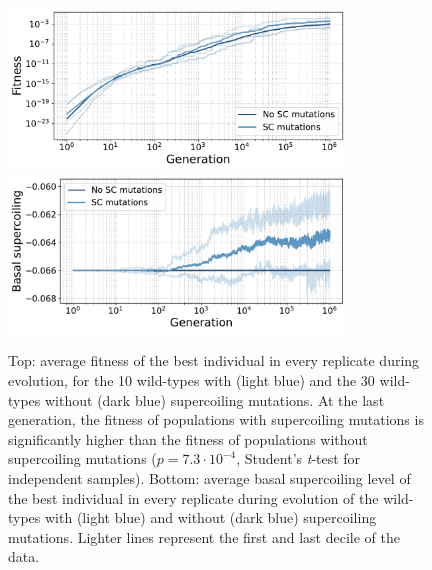 \begin{figure}
\centering
\includegraphics[width=0.8\textwidth]{epistasis/img/fitness_all_with_main.pdf}
\includegraphics[width=0.8\textwidth]{epistasis/img/basal_sc_all.pdf}
\caption[Average basal supercoiling and fitness during evolution of the wild-types, with basal supercoiling level mutations]{Top: average fitness of the best individual in every replicate during evolution, for the 10 wild-types with (light blue) and the 30 wild-types without (dark blue) supercoiling mutations.
At the last generation, the fitness of populations with supercoiling mutations is significantly higher than the fitness of populations without supercoiling mutations ($p = 7.3\cdot10^{-4}$, Student's \emph{t}-test for independent samples).
Bottom: average basal supercoiling level of the best individual in every replicate during evolution of the wild-types with (light blue) and without (dark blue) supercoiling mutations.
Lighter lines represent the first and last decile of the data.}
\label{fig:epistasis:wt-evolution}
\end{figure}

